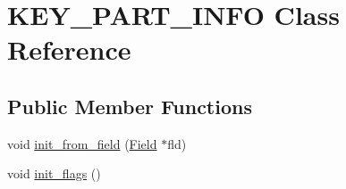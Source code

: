 \hypertarget{classKEY__PART__INFO}{}\section{K\+E\+Y\+\_\+\+P\+A\+R\+T\+\_\+\+I\+N\+FO Class Reference}
\label{classKEY__PART__INFO}
\subsection*{Public Member Functions}
\begin{DoxyCompactItemize}
\item 
void \mbox{\hyperlink{classKEY__PART__INFO_a5cbdb2fd6efbec7017e21d3abfa5af84}{init\+\_\+from\+\_\+field}} (\mbox{\hyperlink{classField}{Field}} $\ast$fld)
\item 
void \mbox{\hyperlink{classKEY__PART__INFO_a2e9833a3f8ee214bb0d9b7b7c982fe6f}{init\+\_\+flags}} ()
\end{DoxyCompactItemize}

